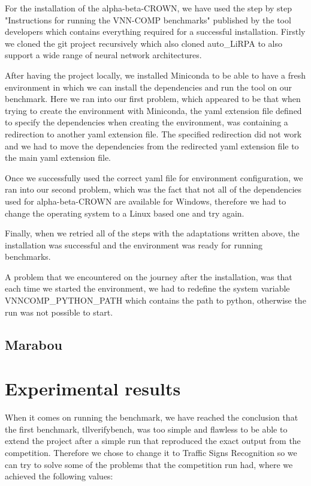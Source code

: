 \documentclass[12pt,a4paper]{report}
\newcommand\tab[1][5mm]{\hspace*{#1}}
\begin{document}
\tab For the installation of the alpha-beta-CROWN, we have used the step by step "Instructions for running the VNN-COMP benchmarks"\cite{alpha-beta-instructions} published by the tool developers which contains everything required for a successful installation. Firstly we cloned the git project recursively which also cloned auto\_LiRPA\cite{auto_lirpa_repo} to also support a wide range of neural network architectures.

After having the project locally, we installed Miniconda\cite{miniconda} to be able to have a fresh environment in which we can install the dependencies and run the tool on our benchmark. Here we ran into our first problem, which appeared to be that when trying to create the environment with Miniconda\cite{miniconda}, the yaml extension file defined to specify the dependencies when creating the environment, was containing a redirection to another yaml extension file. The specified redirection did not work and we had to move the dependencies from the redirected yaml extension file to the main yaml extension file.

Once we successfully used the correct yaml file for environment configuration, we ran into our second problem, which was the fact that not all of the dependencies used for alpha-beta-CROWN are available for Windows, therefore we had to change the operating system to a Linux based one and try again.

Finally, when we retried all of the steps with the adaptations written above, the installation was successful and the environment was ready for running benchmarks.

A problem that we encountered on the journey after the installation, was that each time we started the environment, we had to redefine the system variable VNNCOMP\_PYTHON\_PATH which contains the path to python, otherwise the run was not possible to start.

\newpage
\section{Marabou}

\chapter{Experimental results}
\tab When it comes on running the benchmark, we have reached the conclusion that the first benchmark, tllverifybench\cite{tll_verify_bench}, was too simple and flawless to be able to extend the project after a simple run that reproduced the exact output from the competition. Therefore we chose to change it to Traffic Signs Recognition\cite{traffic_signs_recognition} so we can try to solve some of the problems that the competition run had, where we achieved the following values:
\end{document}

